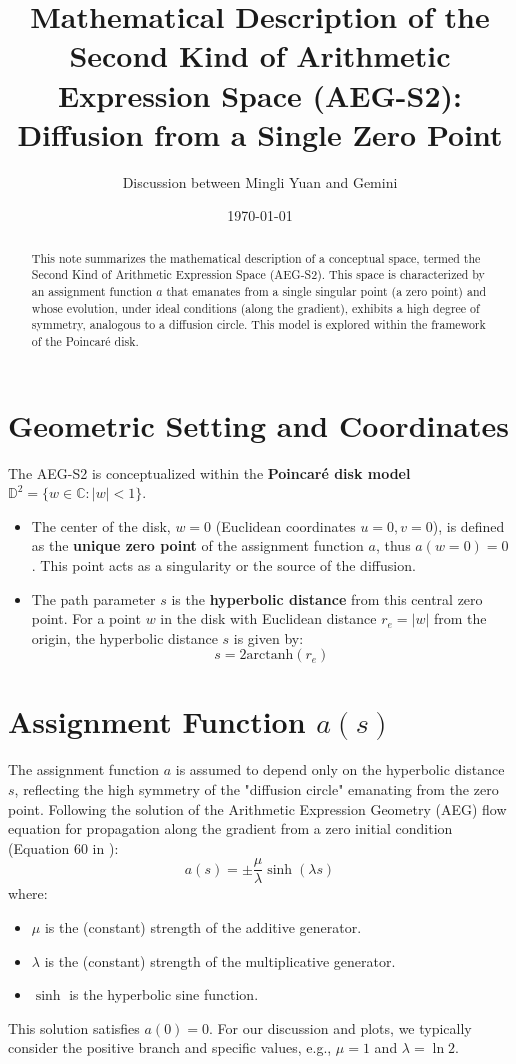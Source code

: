 \documentclass[12pt]{article}
\title{Mathematical Description of the Second Kind of Arithmetic Expression Space (AEG-S2): Diffusion from a Single Zero Point}
\author{Discussion between Mingli Yuan and Gemini}
\date{\today}
\begin{document}
\maketitle

\begin{abstract}
This note summarizes the mathematical description of a conceptual space, termed the Second Kind of Arithmetic Expression Space (AEG-S2). This space is characterized by an assignment function $a$ that emanates from a single singular point (a zero point) and whose evolution, under ideal conditions (along the gradient), exhibits a high degree of symmetry, analogous to a diffusion circle. This model is explored within the framework of the Poincaré disk.
\end{abstract}

\section{Geometric Setting and Coordinates}
The AEG-S2 is conceptualized within the \textbf{Poincaré disk model} $\mathbb{D}^2 = \{w \in \mathbb{C} : |w| < 1\}$.
\begin{itemize}
    \item The center of the disk, $w=0$ (Euclidean coordinates $u=0, v=0$), is defined as the \textbf{unique zero point} of the assignment function $a$, thus $a(w=0)=0$. This point acts as a singularity or the source of the diffusion.
    \item The path parameter $s$ is the \textbf{hyperbolic distance} from this central zero point. For a point $w$ in the disk with Euclidean distance $r_e = |w|$ from the origin, the hyperbolic distance $s$ is given by:
    $$ s = 2 \text{arctanh}(r_e) $$
\end{itemize}

\section{Assignment Function $a(s)$}
The assignment function $a$ is assumed to depend only on the hyperbolic distance $s$, reflecting the high symmetry of the "diffusion circle" emanating from the zero point. Following the solution of the Arithmetic Expression Geometry (AEG) flow equation for propagation along the gradient from a zero initial condition (Equation 60 in \cite{YuanAEG2025}):
$$ a(s) = \pm \frac{\mu}{\lambda} \sinh(\lambda s) $$
where:
\begin{itemize}
    \item $\mu$ is the (constant) strength of the additive generator.
    \item $\lambda$ is the (constant) strength of the multiplicative generator.
    \item $\sinh$ is the hyperbolic sine function.
\end{itemize}
This solution satisfies $a(0)=0$. For our discussion and plots, we typically consider the positive branch and specific values, e.g., $\mu=1$ and $\lambda=\ln 2$.
\end{document}
